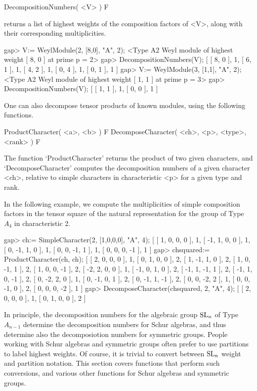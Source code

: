 \>DecompositionNumbers( <V> ) F
 
returns a list of highest weights of the composition factors of <V>,
along with their corresponding multiplicities. 

\beginexample
gap> V:= WeylModule(2, [8,0], "A", 2);
<Type A2 Weyl module of highest weight [ 8, 0 ] at prime p = 2>
gap> DecompositionNumbers(V);
[ [ 8, 0 ], 1, [ 6, 1 ], 1, [ 4, 2 ], 1, [ 0, 4 ], 1, [ 0, 1 ], 1 ]
gap> V:= WeylModule(3, [1,1], "A", 2);
<Type A2 Weyl module of highest weight [ 1, 1 ] at prime p = 3>
gap> DecompositionNumbers(V);         
[ [ 1, 1 ], 1, [ 0, 0 ], 1 ]
\endexample



One can also decompose tensor products of known modules, using the
following functions.

\>ProductCharacter( <a>, <b> ) F
\>DecomposeCharacter( <ch>, <p>, <type>, <rank> ) F

The function `ProductCharacter' returns the product of two given
characters, and `DecomposeCharacter' computes the decomposition
numbers of a given character <ch>, relative to simple characters in
characteristic <p> for a given type and rank. 

In the following example, we compute the multiplicities of simple
composition factors in the tensor square of the natural representation
for the group of Type $A_4$ in characteristic 2.

\beginexample
gap> ch:= SimpleCharacter(2, [1,0,0,0], "A", 4);
[ [ 1, 0, 0, 0 ], 1, [ -1, 1, 0, 0 ], 1, [ 0, -1, 1, 0 ], 1, [ 0, 0, -1, 1 ], 
  1, [ 0, 0, 0, -1 ], 1 ]
gap> chsquared:= ProductCharacter(ch, ch);
[ [ 2, 0, 0, 0 ], 1, [ 0, 1, 0, 0 ], 2, [ 1, -1, 1, 0 ], 2, [ 1, 0, -1, 1 ], 
  2, [ 1, 0, 0, -1 ], 2, [ -2, 2, 0, 0 ], 1, [ -1, 0, 1, 0 ], 2, 
  [ -1, 1, -1, 1 ], 2, [ -1, 1, 0, -1 ], 2, [ 0, -2, 2, 0 ], 1, 
  [ 0, -1, 0, 1 ], 2, [ 0, -1, 1, -1 ], 2, [ 0, 0, -2, 2 ], 1, 
  [ 0, 0, -1, 0 ], 2, [ 0, 0, 0, -2 ], 1 ]
gap> DecomposeCharacter(chsquared, 2, "A", 4);
[ [ 2, 0, 0, 0 ], 1, [ 0, 1, 0, 0 ], 2 ]
\endexample




In principle, the decomposition numbers for the algebraic group ${\rm
  SL}_n$ of Type $A_{n-1}$ determine the decomposition numbers for
Schur algebras, and thus determine also the decomposiotion numbers for
symmetric groups. People working with Schur algebras and symmetric
groups often prefer to use partitions to label highest weights. Of
course, it is trivial to convert between ${\rm SL}_n$ weight and
partition notation. This section covers functions that perform such
conversions, and various other functions for Schur algebras and
symmetric groups.

